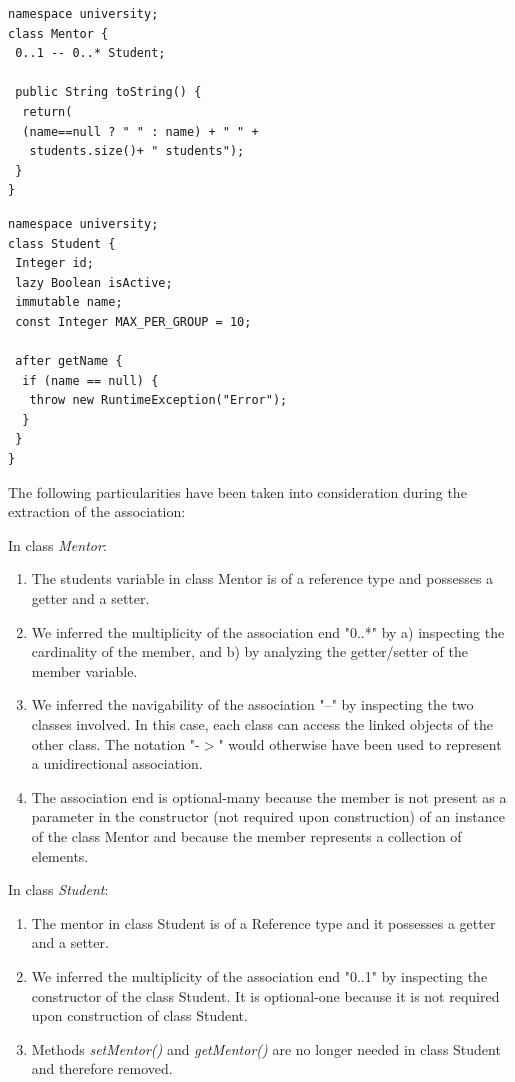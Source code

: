 \begin{lstlisting}[style=UmpleOut,caption=Mentor.ump,label=lst:mentorUmple2]
namespace university;
class Mentor {
 0..1 -- 0..* Student; 
 
 public String toString() {
  return(
  (name==null ? " " : name) + " " +
   students.size()+ " students");
 }
}
\end{lstlisting}

\begin{lstlisting}[style=UmpleOut,caption=Student.ump,label=lst:studentUmple2]
namespace university;
class Student {
 Integer id; 
 lazy Boolean isActive; 
 immutable name; 
 const Integer MAX_PER_GROUP = 10; 
 
 after getName {
  if (name == null) { 
   throw new RuntimeException("Error");
  }
 }
}
\end{lstlisting}

The following particularities have been taken into consideration during the extraction of the association:

In class \textit{Mentor}:
\begin{enumerate}
\item The students variable in class Mentor is of a reference type and possesses a getter and a setter.
\item We inferred the multiplicity of the association end "0..*" by a) inspecting the cardinality of the member, and b) by analyzing the getter/setter of the member variable.
\item We inferred the navigability of the association "--" by inspecting the two classes involved. In this case, each class can access the linked objects of the other class.  The notation "-$>$" would otherwise have been used to represent a unidirectional association. 


\item The association end is optional-many because the member is not present as a parameter in the constructor (not required upon construction) of an instance of the class Mentor and because the member represents a collection of elements. 
\end{enumerate}

In class \textit{Student}:
\begin{enumerate}

\item The mentor in class Student is of a Reference type and it possesses a getter and a setter.
\item We inferred the multiplicity of the association end "0..1" by inspecting the constructor of the class Student. It is optional-one because it is not required upon construction of class Student. 
\item Methods \textit{setMentor()} and \textit{getMentor()} are no longer needed in class Student and therefore removed.
\end{enumerate}

